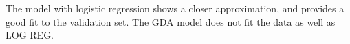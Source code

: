 \begin{answer}

The model with logistic regression shows a closer approximation, and provides a good fit to the validation set.
The GDA model does not fit the data as well as LOG REG.

\end{answer}
